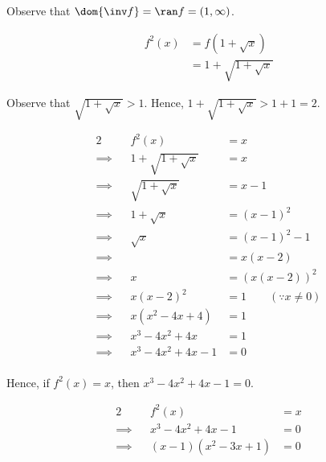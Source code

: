 \documentclass{jhwhw}
\begin{document}

                Observe that $\dom{\inv f} = \ran f = (1, \infty)$.


            \subpart
                \begin{align*}
                    f^2(x) &= f(1+\sqrt{x})\\
                    &= 1 + \sqrt{1 + \sqrt{x}}
                \end{align*}


                Observe that $\sqrt{1 + \sqrt{x}} > 1$. Hence, $1 + \sqrt{1 + \sqrt{x}} > 1 + 1 = 2$.


            \subpart
                \begin{alignat*}{2}
                    &&f^2(x) &= x\\
                    \implies&& 1 + \sqrt{1 + \sqrt{x}} &= x\\
                    \implies&& \sqrt{1 + \sqrt{x}} &= x - 1\\
                    \implies&& 1 + \sqrt{x} &= (x - 1)^2\\
                    \implies&& \sqrt{x} &= (x - 1)^2 - 1\\
                    \implies&& &= x(x-2)\\
                    \implies&& x &= (x(x-2))^2\\
                    \implies&& x(x-2)^2 &= 1 \qquad (\because x \neq 0)\\
                    \implies&& x\left(x^2 -4x + 4 \right) &= 1 \\
                    \implies&& x^3 -4x^2 + 4x  &= 1 \\
                    \implies&& x^3 -4x^2 + 4x -1 &= 0 \\
                \end{alignat*}

                Hence, if $f^2(x) = x$, then $x^3 -4x^2 + 4x -1 = 0$.

                \begin{alignat*}{2}
                    &&f^2(x) &= x\\
                    \implies&&x^3 -4x^2 + 4x -1 &= 0 \\
                    \implies&&(x-1)\left(x^2-3x+1\right) &= 0
                \end{alignat*}
\end{document}
